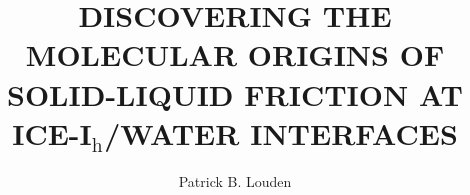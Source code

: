 \documentclass[noinfo,final,sort&compress]{nddiss2e}
\begin{document}
\frontmatter %

\title{DISCOVERING THE MOLECULAR ORIGINS OF SOLID-LIQUID FRICTION AT 
  ICE-I$_\mathrm{h}$/WATER INTERFACES}
\author{Patrick B. Louden}
\maketitle

\end{document}
